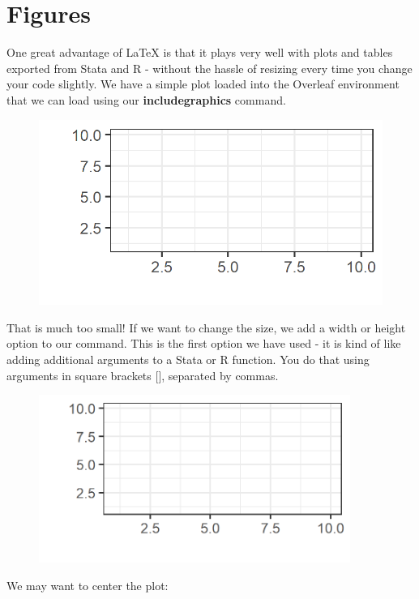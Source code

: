 \documentclass{article}
\begin{document}
\newpage 
\section*{Figures} %

One great advantage of LaTeX is that it plays very well with plots and tables exported from Stata and R - without the hassle of resizing every time you change your code slightly. We have a simple plot loaded into the Overleaf environment that we can load using our \textbf{includegraphics} command.

\begin{figure}[!ht]
	\includegraphics{figures/plot.png}
\end{figure}

That is much too small! If we want to change the size, we add a width or height option to our command. This is the first option we have used - it is kind of like adding additional arguments to a Stata or R function. You do that using arguments in square brackets [], separated by commas.

\begin{figure}[!ht]
	\includegraphics[width=4in]{figures/plot.png}
\end{figure}

\newpage We may want to center the plot:
\end{document}
